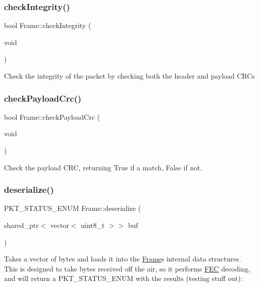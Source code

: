 \subsubsection{\texorpdfstring{check\+Integrity()}{checkIntegrity()}}
{\footnotesize\ttfamily bool Frame\+::check\+Integrity (\begin{DoxyParamCaption}\item[{void}]{ }\end{DoxyParamCaption})\hspace{0.3cm}{\ttfamily [inline]}}

Check the integrity of the packet by checking both the header and payload C\+R\+Cs \mbox{\label{classFrame_ae073ad6b06c8eb7073b390474e869224}} 
\subsubsection{\texorpdfstring{check\+Payload\+Crc()}{checkPayloadCrc()}}
{\footnotesize\ttfamily bool Frame\+::check\+Payload\+Crc (\begin{DoxyParamCaption}\item[{void}]{ }\end{DoxyParamCaption})\hspace{0.3cm}{\ttfamily [inline]}}

Check the payload C\+RC, returning True if a match, False if not. \mbox{\label{classFrame_ab60c3b088b1ef6b52944fa1f4b5ae51a}} 
\subsubsection{\texorpdfstring{deserialize()}{deserialize()}}
{\footnotesize\ttfamily P\+K\+T\+\_\+\+S\+T\+A\+T\+U\+S\+\_\+\+E\+N\+UM Frame\+::deserialize (\begin{DoxyParamCaption}\item[{shared\+\_\+ptr$<$ vector$<$ uint8\+\_\+t $>$$>$}]{buf }\end{DoxyParamCaption})}

Takes a vector of bytes and loads it into the \hyperlink{classFrame}{Frame}\textquotesingle{}s internal data structures. This is designed to take bytes received off the air, so it performs \hyperlink{classFEC}{F\+EC} decoding, and will return a P\+K\+T\+\_\+\+S\+T\+A\+T\+U\+S\+\_\+\+E\+N\+UM with the results (testing stuff out)\+: ~\newline


